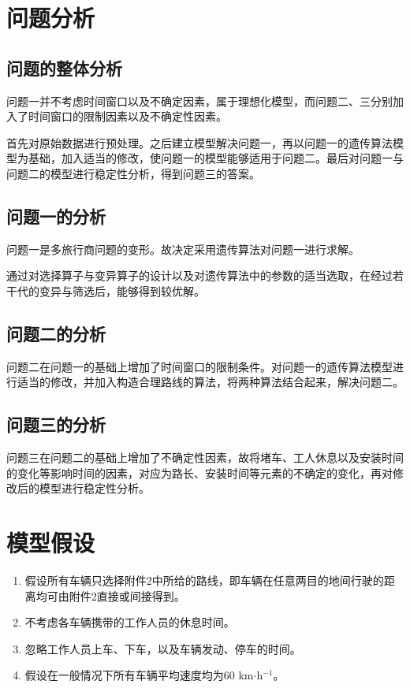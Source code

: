 \documentclass[UTF8,cs4size]{ctexart}
\begin{document}
\section{问题分析}
\subsection{问题的整体分析}
问题一并不考虑时间窗口以及不确定因素，属于理想化模型，而问题二、三分别加入了时间窗口的限制因素以及不确定性因素。

首先对原始数据进行预处理。之后建立模型解决问题一，再以问题一的遗传算法模型为基础，加入适当的修改，使问题一的模型能够适用于问题二。最后对问题一与问题二的模型进行稳定性分析，得到问题三的答案。
\subsection{问题一的分析}
问题一是多旅行商问题的变形。故决定采用遗传算法对问题一进行求解。

通过对选择算子与变异算子的设计以及对遗传算法中的参数的适当选取，在经过若干代的变异与筛选后，能够得到较优解。
\subsection{问题二的分析}
问题二在问题一的基础上增加了时间窗口的限制条件。对问题一的遗传算法模型进行适当的修改，并加入构造合理路线的算法，将两种算法结合起来，解决问题二。
\subsection{问题三的分析}
问题三在问题二的基础上增加了不确定性因素，故将堵车、工人休息以及安装时间的变化等影响时间的因素，对应为路长、安装时间等元素的不确定的变化，再对修改后的模型进行稳定性分析。
\section{模型假设}
\begin{enumerate}
\item 假设所有车辆只选择附件2中所给的路线，即车辆在任意两目的地间行驶的距离均可由附件2直接或间接得到。
\item 不考虑各车辆携带的工作人员的休息时间。
\item 忽略工作人员上车、下车，以及车辆发动、停车的时间。
\item 假设在一般情况下所有车辆平均速度均为60 km$\cdot$h$^{-1}$。
\end{enumerate}
\end{document}
